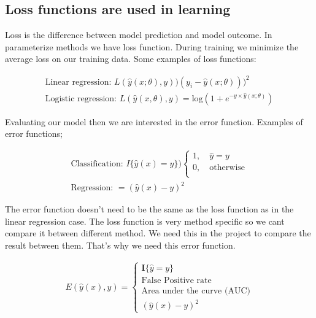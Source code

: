 \subsection*{Loss functions are used in learning}
Loss is the difference between model prediction and model outcome. In parameterize methods we have loss function. During training we minimize the average loss on our training data. Some examples of loss functions:

\begin{equation}
\begin{aligned}
\text{Linear regression: }L(\hat{y}(x;\theta),y) ) (y_i-\hat{y}(x;\theta)))^{2}\\
\text{Logistic regression: } L(\hat{y}(x,\theta),y) = \text{log}(1+e^{-y \times \hat{y}(x;\theta)})
\end{aligned}
\end{equation}

Evaluating our model then we are interested in the error function. Examples of error functions;

\begin{equation}
\begin{aligned}
\text{Classification: }I\{ \hat{y}(x) = y\} ) \begin{cases}
1, \quad \hat{y}=y \\
0, \quad \text{otherwise} \\
\end{cases} \\
\text{Regression: } = (\hat{y} (x)-y)^{2}
\end{aligned}
\end{equation}

The error function doesn't need to be the same as the loss function as in the linear regression case. The loss function is very method specific so we cant compare it between different method. We need this in the project to compare the result between them. That's why we need this error function.

\begin{equation}
\begin{aligned}
E(\hat{y}(x),y) = \begin{cases}
\textbf{I}\{ \hat{y}= y\} \\
\text{False Positive rate} \\
\text{Area under the curve (AUC)} \\
(\hat{y} (x)-y)^{2}
\end{cases} 
\end{aligned}
\end{equation}

